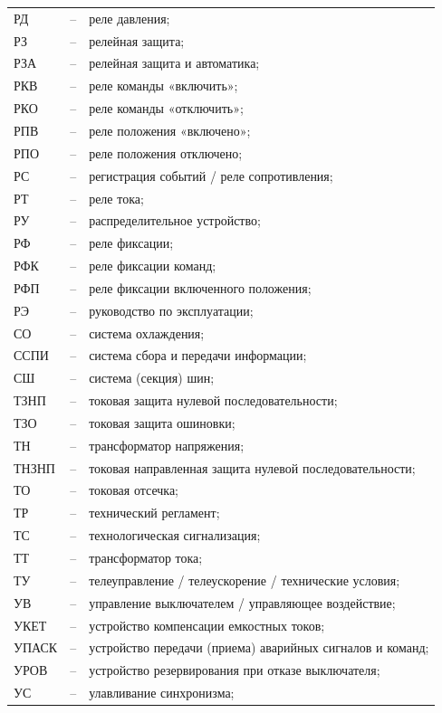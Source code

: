 \begin{longtable}{L{2cm} L{0.5cm} L{20cm}}
РД & -- & реле давления; \\
РЗ & -- & релейная защита; \\
РЗА & -- & релейная защита и автоматика; \\
РКВ & -- & реле команды «включить»; \\
РКО & -- & реле команды «отключить»; \\
РПВ & -- & реле положения «включено»; \\
РПО & -- & реле положения отключено; \\
РС & -- & регистрация событий / реле сопротивления; \\
РТ & -- & реле тока; \\
РУ & -- & распределительное устройство; \\
РФ & -- & реле фиксации; \\
РФК & -- & реле фиксации команд; \\
РФП & -- & реле фиксации включенного положения; \\
РЭ & -- & руководство по эксплуатации; \\
СО & -- & система охлаждения; \\
ССПИ & -- & система сбора и передачи информации; \\
СШ & -- & система (секция) шин; \\
ТЗНП & -- & токовая защита нулевой последовательности; \\
ТЗО & -- & токовая защита ошиновки; \\
ТН & -- & трансформатор напряжения; \\
ТНЗНП & -- & токовая направленная защита нулевой последовательности; \\
ТО & -- & токовая отсечка; \\
ТР & -- & технический регламент; \\
ТС & -- & технологическая сигнализация; \\
ТТ & -- & трансформатор тока; \\
ТУ & -- & телеуправление / телеускорение / технические условия; \\
УВ & -- & управление выключателем / управляющее воздействие; \\
УКЕТ & -- & устройство компенсации емкостных токов; \\
УПАСК & -- & устройство передачи (приема) аварийных сигналов и команд; \\
УРОВ & -- & устройство резервирования при отказе выключателя; \\
УС & -- & улавливание синхронизма; \\

\end{longtable}
